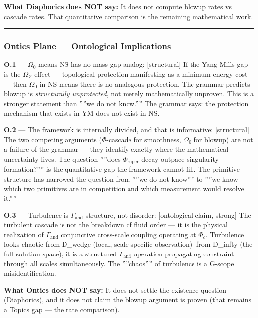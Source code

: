 \documentclass[11pt,a4paper]{article}
\begin{document}
\textbf{What Diaphorics does NOT say:} It does not compute blowup rates vs cascade rates. That quantitative comparison is the remaining mathematical work.

\begin{center}
\rule{0.5\textwidth}{0.4pt}
\end{center}

\subsubsection{Ontics Plane --- Ontological Implications}

\textbf{O.1} --- $\Omega_0$ means NS has no mass-gap analog: {[}structural{]} If the Yang-Mills gap is the $\Omega_Z$ effect --- topological protection manifesting as a minimum energy cost --- then $\Omega_0$ in NS means there is no analogous protection. The grammar predicts blowup is \emph{structurally unprotected}, not merely mathematically unproven. This is a stronger statement than ''''we do not know.'''' The grammar says: the protection mechanism that exists in YM does not exist in NS.

\textbf{O.2} --- The framework is internally divided, and that is informative: {[}structural{]} The two competing arguments ($\Phi$-cascade for smoothness, $\Omega_0$ for blowup) are not a failure of the grammar --- they identify exactly where the mathematical uncertainty lives. The question ''''does $\Phi_\text{super}$ decay outpace singularity formation?'''' is the quantitative gap the framework cannot fill. The primitive structure has narrowed the question from ''''we do not know'''' to ''''we know which two primitives are in competition and which measurement would resolve it.''''

\textbf{O.3} --- Turbulence is $\Gamma_\text{and}$ structure, not disorder: {[}ontological claim, strong{]} The turbulent cascade is not the breakdown of fluid order --- it is the physical realization of $\Gamma_\text{and}$ conjunctive cross-scale coupling operating at $\Phi_c$. Turbulence looks chaotic from D\_wedge (local, scale-specific observation); from D\_infty (the full solution space), it is a structured $\Gamma_\text{and}$ operation propagating constraint through all scales simultaneously. The ''''chaos'''' of turbulence is a G-scope misidentification.

\textbf{What Ontics does NOT say:} It does not settle the existence question (Diaphorics), and it does not claim the blowup argument is proven (that remains a Topics gap --- the rate comparison).
\end{document}
